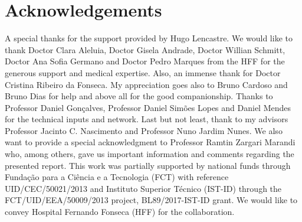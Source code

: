 
\section{Acknowledgements}
\label{sec:sec012}

A special thanks for the support provided by Hugo Lencastre. We would like to thank Doctor Clara Aleluia, Doctor Gisela Andrade, Doctor Willian Schmitt, Doctor Ana Sofia Germano and Doctor Pedro Marques from the HFF for the generous support and medical expertise. Also, an immense thank for Doctor Cristina Ribeiro da Fonseca. My appreciation goes also to Bruno Cardoso and Bruno Dias for help and above all for the good companionship. Thanks to Professor Daniel Gon\c{c}alves, Professor Daniel Sim\~{o}es Lopes and Daniel Mendes for the technical inputs and network. Last but not least, thank to my advisors Professor Jacinto C. Nascimento and Professor Nuno Jardim Nunes. We also want to provide a special acknowledgment to Professor Ramtin Zargari Marandi who, among others, gave us important information and comments regarding the presented report. This work was partially supported by national funds through Funda\c{c}\~{a}o para a Ci\^{e}ncia e a Tecnologia (FCT) with reference UID/CEC/50021/2013 and Instituto Superior T\'{e}cnico (IST-ID) through the FCT/UID/EEA/50009/2013 project, BL89/2017-IST-ID grant. We would like to convey Hospital Fernando Fonseca (HFF) for the collaboration.